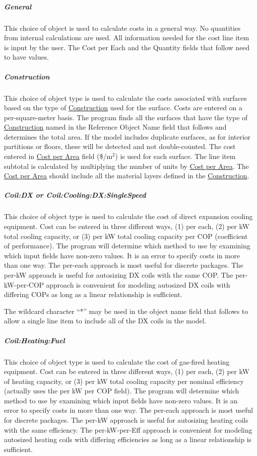 \subparagraph{General}\label{general}


This choice of object is used to calculate costs in a general way. No quantities from internal calculations are used. All information needed for the cost line item is input by the user. The Cost per Each and the Quantity fields that follow need to have values.

\subparagraph{Construction}\label{construction-costlineitem}

This choice of object type is used to calculate the costs associated with surfaces based on the type of \hyperref[construction-000]{Construction} used for the surface. Costs are entered on a per-square-meter basis. The program finds all the surfaces that have the type of \hyperref[construction-000]{Construction} named in the Reference Object Name field that follows and determines the total area. If the model includes duplicate surfaces, as for interior partitions or floors, these will be detected and not double-counted. The cost entered in \hyperref[field-cost-per-area]{Cost per Area} field (\$/m\(^{2}\)) is used for each surface. The line item subtotal is calculated by multiplying the number of units by \hyperref[field-cost-per-area]{Cost per Area}. The \hyperref[field-cost-per-area]{Cost per Area} should include all the material layers defined in the \hyperref[construction-000]{Construction}.

\subparagraph{Coil:DX or Coil:Cooling:DX:SingleSpeed}\label{coildx-or-coilcoolingdxsinglespeed}

This choice of object type is used to calculate the cost of direct expansion cooling equipment. Cost can be entered in three different ways, (1) per each, (2) per kW total cooling capacity, or (3) per kW total cooling capacity per COP (coefficient of performance). The program will determine which method to use by examining which input fields have non-zero values. It is an error to specify costs in more than one way. The per-each approach is most useful for discrete packages. The per-kW approach is useful for autosizing DX coils with the same COP. The per-kW-per-COP approach is convenient for modeling autosized DX coils with differing COPs as long as a linear relationship is sufficient.

The wildcard character ``*'' may be used in the object name field that follows to allow a single line item to include all of the DX coils in the model.

\subparagraph{Coil:Heating:Fuel}\label{coilheatinggas}

This choice of object type is used to calculate the cost of gas-fired heating equipment. Cost can be entered in three different ways, (1) per each, (2) per kW of heating capacity, or (3) per kW total cooling capacity per nominal efficiency (actually uses the per kW per COP field). The program will determine which method to use by examining which input fields have non-zero values. It is an error to specify costs in more than one way. The per-each approach is most useful for discrete packages. The per-kW approach is useful for autosizing heating coils with the same efficiency. The per-kW-per-Eff approach is convenient for modeling autosized heating coils with differing efficiencies as long as a linear relationship is sufficient.

